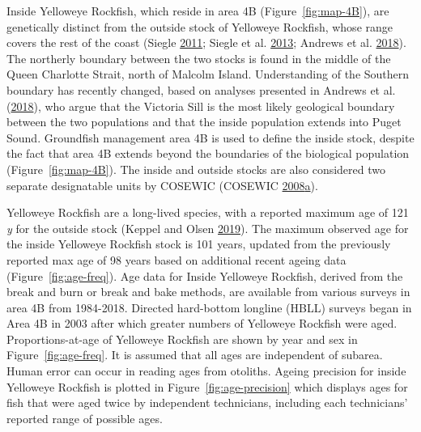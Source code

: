 \documentclass[11pt]{book}
\begin{document}
\setlength{\parindent}{0in} \setlength{\leftskip}{0in} \setlength{\parskip}{4pt}

\clearpage

\Appendices


\clearpage

\label{app:biological-data}

Inside Yelloweye Rockfish, which reside in area 4B (Figure~\ref{fig:map-4B}), are genetically distinct from the outside stock of Yelloweye Rockfish, whose range covers the rest of the coast (Siegle \protect\hyperlink{ref-siegle2011}{2011}; Siegle et al. \protect\hyperlink{ref-siegle2013}{2013}; Andrews et al. \protect\hyperlink{ref-andrews2018}{2018}). The northerly boundary between the two stocks is found in the middle of the Queen Charlotte Strait, north of Malcolm Island. Understanding of the Southern boundary has recently changed, based on analyses presented in Andrews et al. (\protect\hyperlink{ref-andrews2018}{2018}), who argue that the Victoria Sill is the most likely geological boundary between the two populations and that the inside population extends into Puget Sound. Groundfish management area 4B is used to define the inside stock, despite the fact that area 4B extends beyond the boundaries of the biological population (Figure~\ref{fig:map-4B}). The inside and outside stocks are also considered two separate designatable units by COSEWIC (COSEWIC \protect\hyperlink{ref-cosewic2008}{2008}\protect\hyperlink{ref-cosewic2008}{a}).

\hypertarget{sec:growth}{%
\label{sec:growth}}

Yelloweye Rockfish are a long-lived species, with a reported maximum age of 121 \emph{y} for the outside stock (Keppel and Olsen \protect\hyperlink{ref-keppel2019}{2019}). The maximum observed age for the inside Yelloweye Rockfish stock is 101 years, updated from the previously reported max age of 98 years based on additional recent ageing data (Figure~\ref{fig:age-freq}). Age data for Inside Yelloweye Rockfish, derived from the break and burn or break and bake methods, are available from various surveys in area 4B from 1984-2018. Directed hard-bottom longline (HBLL) surveys began in Area 4B in 2003 after which greater numbers of Yelloweye Rockfish were aged. Proportions-at-age of Yelloweye Rockfish are shown by year and sex in Figure~\ref{fig:age-freq}. It is assumed that all ages are independent of subarea. Human error can occur in reading ages from otoliths. Ageing precision for inside Yelloweye Rockfish is plotted in Figure~\ref{fig:age-precision} which displays ages for fish that were aged twice by independent technicians, including each technicians' reported range of possible ages.
\end{document}
